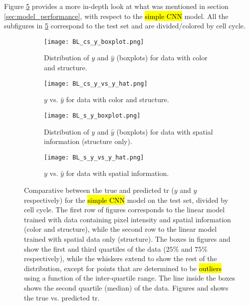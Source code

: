 
\glsresetall
\graphicspath{{./Sections/Results/Resources/}}


Figure \ref{fig:results:bl_performance} provides a more in-depth look at what was mentioned in section \ref{sec:model_performance}, with respect to the \hl{simple CNN} model. All the subfigures in \ref{fig:results:bl_performance} correspond to the test set and are divided/colored by cell cycle.

\begin{figure}[!ht]
  \centering
  \begin{subfigure}[b]{.5\linewidth}
    \texttt{[image: BL\_cs\_y\_boxplot.png]}
    \caption{Distribution of $y$ and $\hat{y}$ (boxplots) for data with color and structure.}
    \label{fig:results:bl_performance:cs_dist}
  \end{subfigure}
  \begin{subfigure}[b]{.27\linewidth}
    \texttt{[image: BL\_cs\_y\_vs\_y\_hat.png]}
    \caption{$y$ vs. $\hat{y}$ for data with color and structure.}
    \label{fig:results:bl_performance:cs_y_vs_y_hat}
  \end{subfigure}%
  \vspace{3mm}
  \begin{subfigure}[b]{.5\linewidth}
    \texttt{[image: BL\_s\_y\_boxplot.png]}
    \caption{Distribution of $y$ and $\hat{y}$ (boxplots) for data with spatial information (structure only).}
    \label{fig:results:bl_performance:s_dist}
  \end{subfigure}
  \begin{subfigure}[b]{.27\linewidth}
    \texttt{[image: BL\_s\_y\_vs\_y\_hat.png]}
    \caption{$y$ vs. $\hat{y}$ for data with spatial information.}
    \label{fig:results:bl_performance:s_y_vs_y_hat}
  \end{subfigure}
  \caption{Comparative between the true and predicted \gls{tr} ($y$ and $\hat{y}$ respectively) for the \hl{simple CNN} model on the test set, divided by cell cycle. The first row of figures corresponds to the linear model trained with data containing pixel intensity and spatial information (color and structure), while the second row to the linear model trained with spatial data only (structure). The boxes in figures  and  show the first and third quartiles of the data ($25\%$ and $75\%$ respectively), while the whiskers extend to show the rest of the distribution, except for points that are determined to be \hl{outliers} using a function of the inter-quartile range. The line inside the boxes shows the second quartile (median) of the data. Figures  and  shows the true vs. predicted \gls{tr}.}
  \label{fig:results:bl_performance}
\end{figure}

